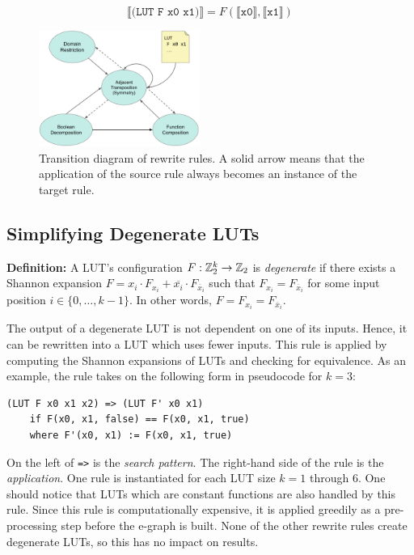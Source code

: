\begin{equation}
    \llbracket \texttt{(LUT F x0 x1)} \rrbracket = F(\llbracket \texttt{x0} \rrbracket, \llbracket \texttt{x1} \rrbracket)
\end{equation}

\begin{figure}
    \centering
    \includegraphics[width=0.47\textwidth]{img/rewrites.png}
    \caption{Transition diagram of rewrite rules. A solid arrow means that the application of the source rule always becomes an instance of the target rule.}\label{fig:rewrites}
\end{figure}

\subsection{Simplifying Degenerate LUTs}\label{sec:rewrites:degen}

\textbf{Definition:} A LUT's configuration $F : \mathbb{Z}_{2}^{k} \rightarrow \mathbb{Z}_{2}$ is \textit{degenerate} if there exists a Shannon expansion $F = x_i \cdot F_{x_i} + \overline{x_i} \cdot F_{\overline{x}_i}$
such that $F_{x_i} = F_{\overline{x}_i}$ for some input position $i \in \{ 0, \ldots, k -1\}$. In other words, $F = F_{x_i} = F_{\overline{x}_i}$.

The output of a degenerate LUT is not dependent on one of its inputs. Hence, it
can be rewritten into a LUT which uses fewer inputs. This rule is applied by
computing the Shannon expansions of LUTs and checking for equivalence. As an
example, the rule takes on the following form in pseudocode for $k=3$:

\begin{lstlisting}
(LUT F x0 x1 x2) => (LUT F' x0 x1)
    if F(x0, x1, false) == F(x0, x1, true)
    where F'(x0, x1) := F(x0, x1, true)
\end{lstlisting}

On the left of \texttt{=>} is the \textit{search pattern}. The right-hand side
of the rule is the \textit{application}. One rule is instantiated for each LUT
size $k =1$ through 6. One should notice that LUTs which are constant functions
are also handled by this rule. Since this rule is computationally expensive, it
is applied greedily as a pre-processing step before the e-graph is built. None
of the other rewrite rules create degenerate LUTs, so this has no impact on
results.

